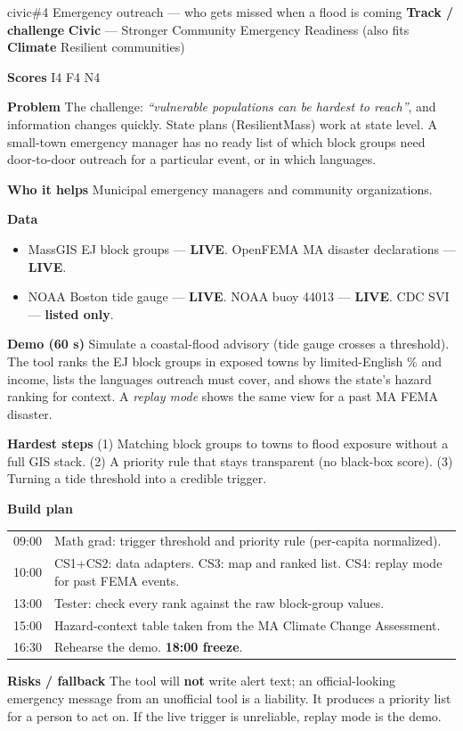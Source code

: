 \documentclass[11pt]{article}
\newcommand{\LIVE}{\textcolor{okgreen}{\textbf{LIVE}}}
\newcommand{\LISTED}{\textcolor{greyish}{\textbf{listed only}}}
\newcommand{\tagC}{\textcolor{civic}{\textbf{Civic}}}
\newcommand{\tagE}{\textcolor{clim}{\textbf{Climate}}}
\newcommand{\field}[1]{\textbf{\textsf{#1}}\quad}
\begin{document}
\begin{ideacard}{civic}{\#4 \quad Emergency outreach --- who gets missed when a flood is coming}
\field{Track / challenge} \tagC{} --- Stronger Community Emergency Readiness (also fits \tagE{} Resilient communities)\par
\field{Scores} I4 F4 N4

\field{Problem} The challenge: \emph{``vulnerable populations can be hardest to reach''}, and
information changes quickly. State plans (ResilientMass) work at state level. A small-town
emergency manager has no ready list of which block groups need door-to-door outreach for a
particular event, or in which languages.

\field{Who it helps} Municipal emergency managers and community organizations.

\field{Data}
\begin{itemize}
\item MassGIS EJ block groups --- \LIVE. OpenFEMA MA disaster declarations --- \LIVE.
\item NOAA Boston tide gauge --- \LIVE. NOAA buoy 44013 --- \LIVE. CDC SVI --- \LISTED.
\end{itemize}

\field{Demo (60 s)} Simulate a coastal-flood advisory (tide gauge crosses a threshold). The
tool ranks the EJ block groups in exposed towns by limited-English \% and income, lists the
languages outreach must cover, and shows the state's hazard ranking for context. A
\emph{replay mode} shows the same view for a past MA FEMA disaster.

\field{Hardest steps} (1) Matching block groups to towns to flood exposure without a full GIS
stack. (2) A priority rule that stays transparent (no black-box score). (3) Turning a tide
threshold into a credible trigger.

\field{Build plan}\par\nopagebreak
\begin{tabularx}{\linewidth}{@{}L{1.2cm} X@{}}
09:00 & Math grad: trigger threshold and priority rule (per-capita normalized).\\
10:00 & CS1+CS2: data adapters. CS3: map and ranked list. CS4: replay mode for past FEMA events.\\
13:00 & Tester: check every rank against the raw block-group values.\\
15:00 & Hazard-context table taken from the MA Climate Change Assessment.\\
16:30 & Rehearse the demo. \textbf{18:00 freeze}.\\
\end{tabularx}

\field{Risks / fallback} The tool will \textbf{not} write alert text; an official-looking
emergency message from an unofficial tool is a liability. It produces a priority list for a
person to act on. If the live trigger is unreliable, replay mode is the demo.
\end{ideacard}
\end{document}
